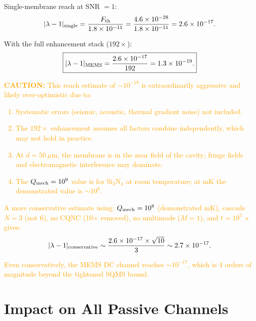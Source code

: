 \documentclass[11pt]{article}
\newcommand{\lam}{\lambda}
\newcommand{\ee}[1]{\times 10^{#1}}
\newcommand{\lbone}{|\lam - 1|}
\newcommand{\caution}[1]{\textcolor{orange}{\textbf{CAUTION:} #1}}
\theoremstyle{definition}
\theoremstyle{remark}
\begin{document}
Single-membrane reach at SNR $= 1$:
\begin{equation}
\lbone_{\rm single} = \frac{F_{\rm th}}{1.8\ee{-11}}
= \frac{4.6\ee{-28}}{1.8\ee{-11}} = 2.6\ee{-17}.
\end{equation}

With the full enhancement stack ($192\times$):
\begin{equation}
\boxed{\lbone_{\rm MEMS} = \frac{2.6\ee{-17}}{192}
= 1.3\ee{-19}.}
\label{eq:mems_reach}
\end{equation}

\caution{This reach estimate of $\sim 10^{-19}$ is extraordinarily
aggressive and likely over-optimistic due to:
\begin{enumerate}[nosep]
\item Systematic errors (seismic, acoustic, thermal gradient noise)
  not included.
\item The $192\times$ enhancement assumes all factors combine
  independently, which may not hold in practice.
\item At $d = 50~\mu$m, the membrane is in the near field of the
  cavity; fringe fields and electromagnetic interference may dominate.
\item The $Q_{\rm mech} = 10^9$ value is for Si$_3$N$_4$ at room
  temperature; at mK the demonstrated value is $\sim 10^8$.
\end{enumerate}

A more conservative estimate using:
$Q_{\rm mech} = 10^8$ (demonstrated mK), cascade $N = 3$ (not 6),
no CQNC (10$\times$ removed), no multimode ($M = 1$), and
$t = 10^5$~s gives:
\begin{equation}
\lbone_{\rm conservative} \sim \frac{2.6\ee{-17} \times \sqrt{10}}{3}
\sim 2.7\ee{-17}.
\end{equation}

Even conservatively, the MEMS DC channel reaches $\sim 10^{-17}$, which
is 4 orders of magnitude beyond the tightened SQMS bound.}


\section{Impact on All Passive Channels}
\label{sec:passive_impact}
\end{document}
